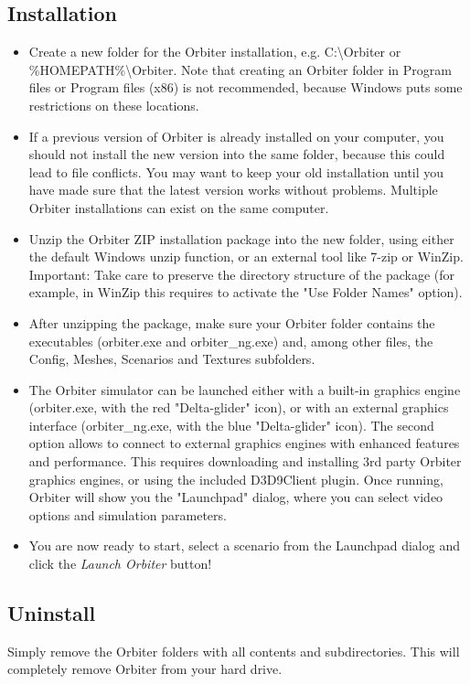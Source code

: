 \documentclass[Orbiter User Manual.tex]{subfiles}
\begin{document}
\subsection{Installation}
\begin{itemize}
\item Create a new folder for the Orbiter installation, e.g. C:\textbackslash Orbiter or \%HOMEPATH\%\textbackslash Orbiter. Note that creating an Orbiter folder in Program files or Program files (x86) is not recommended, because Windows puts some restrictions on these locations.
\item If a previous version of Orbiter is already installed on your computer, you should not install the new version into the same folder, because this could lead to file conflicts. You may want to keep your old installation until you have made sure that the latest version works without problems. Multiple Orbiter installations can exist on the same computer.
\item Unzip the Orbiter ZIP installation package into the new folder, using either the default Windows unzip function, or an external tool like 7-zip or WinZip. Important: Take care to preserve the directory structure of the package (for example, in WinZip this requires to activate the "Use Folder Names" option).
\item After unzipping the package, make sure your Orbiter folder contains the executables (orbiter.exe and orbiter\_ng.exe) and, among other files, the Config, Meshes, Scenarios and Textures subfolders.


\item The Orbiter simulator can be launched either with a built-in graphics engine (orbiter.exe, with the red "Delta-glider" icon), or with an external graphics interface (orbiter\_ng.exe, with the blue "Delta-glider" icon). The second option allows to connect to external graphics engines with enhanced features and performance. This requires downloading and installing 3rd party Orbiter graphics engines, or using the included D3D9Client plugin. Once running, Orbiter will show you the "Launchpad" dialog, where you can select video options and simulation parameters.
\item You are now ready to start, select a scenario from the Launchpad dialog and click the \textit{Launch Orbiter} button!
\end{itemize}

\noindent
{}

\subsection{Uninstall}
Simply remove the Orbiter folders with all contents and subdirectories. This will completely remove Orbiter from your hard drive.
\end{document}
